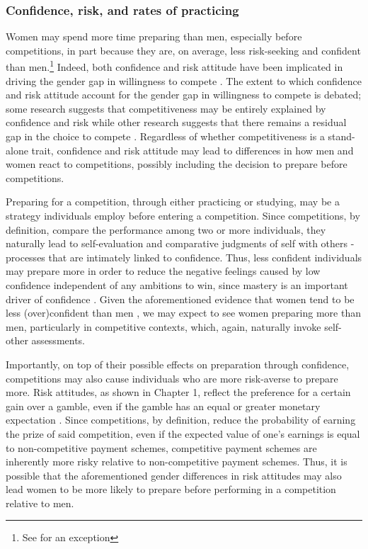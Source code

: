 \documentclass[letterpaper, nobind]{templates/ociamthesis}
\begin{document}
\hypertarget{confidence-risk-and-rates-of-practicing}{%
\subsubsection{Confidence, risk, and rates of practicing}\label{confidence-risk-and-rates-of-practicing}}

Women may spend more time preparing than men, especially before competitions, in part because they are, on average, less risk-seeking \autocite{Croson2009,Dohmen2011b,Eckel2008,Bertrand2010a,Shurchkov2018} and confident \autocite{Bertrand2010,Lundeberg1994,Mobius2011,Barber2001,Croson2009,Shurchkov2018} than men.\footnote{See \textcite{Bandiera2022} for an exception} Indeed, both confidence and risk attitude have been implicated in driving the gender gap in willingness to compete \autocite{Veldhuizen2017,Gillen2019,Niederle2011}. The extent to which confidence and risk attitude account for the gender gap in willingness to compete is debated; some research suggests that competitiveness may be entirely explained by confidence and risk \autocite{Veldhuizen2017,Gillen2019} while other research suggests that there remains a residual gap in the choice to compete \autocite{Niederle2007}. Regardless of whether competitiveness is a stand-alone trait, confidence and risk attitude may lead to differences in how men and women react to competitions, possibly including the decision to prepare before competitions.

Preparing for a competition, through either practicing or studying, may be a strategy individuals employ before entering a competition. Since competitions, by definition, compare the performance among two or more individuals, they naturally lead to self-evaluation and comparative judgments of self with others - processes that are intimately linked to confidence. Thus, less confident individuals may prepare more in order to reduce the negative feelings caused by low confidence independent of any ambitions to win, since mastery is an important driver of confidence \autocite{Gist1992,Usher2008}. Given the aforementioned evidence that women tend to be less (over)confident than men \autocite{Mobius2011,Niederle2011,Croson2009,Lundeberg1994,Niederle2007,Bertrand2010a,Beyer1990,Beyer1997}, we may expect to see women preparing more than men, particularly in competitive contexts, which, again, naturally invoke self-other assessments.

Importantly, on top of their possible effects on preparation through confidence, competitions may also cause individuals who are more risk-averse to prepare more. Risk attitudes, as shown in Chapter 1, reflect the preference for a certain gain over a gamble, even if the gamble has an equal or greater monetary expectation \autocite{Kahneman1982}. Since competitions, by definition, reduce the probability of earning the prize of said competition, even if the expected value of one's earnings is equal to non-competitive payment schemes, competitive payment schemes are inherently more risky relative to non-competitive payment schemes. Thus, it is possible that the aforementioned gender differences in risk attitudes \autocite{Bertrand2010a,Croson2009} may also lead women to be more likely to prepare before performing in a competition relative to men.
\end{document}
